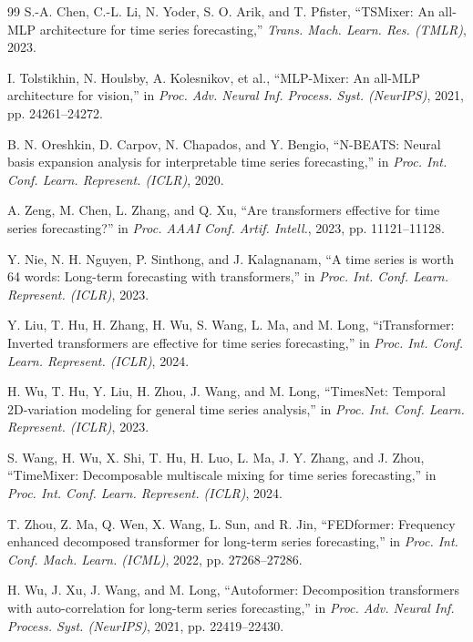 \documentclass[letterpaper,journal]{IEEEtran}
\begin{document}
\begin{thebibliography}{99}
S.-A. Chen, C.-L. Li, N. Yoder, S. O. Arik, and T. Pfister, ``TSMixer: An all-MLP architecture for time series forecasting,'' \textit{Trans. Mach. Learn. Res. (TMLR)}, 2023.

I. Tolstikhin, N. Houlsby, A. Kolesnikov, et al., ``MLP-Mixer: An all-MLP architecture for vision,'' in \textit{Proc. Adv. Neural Inf. Process. Syst. (NeurIPS)}, 2021, pp. 24261--24272.

B. N. Oreshkin, D. Carpov, N. Chapados, and Y. Bengio, ``N-BEATS: Neural basis expansion analysis for interpretable time series forecasting,'' in \textit{Proc. Int. Conf. Learn. Represent. (ICLR)}, 2020.

A. Zeng, M. Chen, L. Zhang, and Q. Xu, ``Are transformers effective for time series forecasting?'' in \textit{Proc. AAAI Conf. Artif. Intell.}, 2023, pp. 11121--11128.

Y. Nie, N. H. Nguyen, P. Sinthong, and J. Kalagnanam, ``A time series is worth 64 words: Long-term forecasting with transformers,'' in \textit{Proc. Int. Conf. Learn. Represent. (ICLR)}, 2023.

Y. Liu, T. Hu, H. Zhang, H. Wu, S. Wang, L. Ma, and M. Long, ``iTransformer: Inverted transformers are effective for time series forecasting,'' in \textit{Proc. Int. Conf. Learn. Represent. (ICLR)}, 2024.

H. Wu, T. Hu, Y. Liu, H. Zhou, J. Wang, and M. Long, ``TimesNet: Temporal 2D-variation modeling for general time series analysis,'' in \textit{Proc. Int. Conf. Learn. Represent. (ICLR)}, 2023.

S. Wang, H. Wu, X. Shi, T. Hu, H. Luo, L. Ma, J. Y. Zhang, and J. Zhou, ``TimeMixer: Decomposable multiscale mixing for time series forecasting,'' in \textit{Proc. Int. Conf. Learn. Represent. (ICLR)}, 2024.

T. Zhou, Z. Ma, Q. Wen, X. Wang, L. Sun, and R. Jin, ``FEDformer: Frequency enhanced decomposed transformer for long-term series forecasting,'' in \textit{Proc. Int. Conf. Mach. Learn. (ICML)}, 2022, pp. 27268--27286.

H. Wu, J. Xu, J. Wang, and M. Long, ``Autoformer: Decomposition transformers with auto-correlation for long-term series forecasting,'' in \textit{Proc. Adv. Neural Inf. Process. Syst. (NeurIPS)}, 2021, pp. 22419--22430.


\end{thebibliography}
\end{document}
